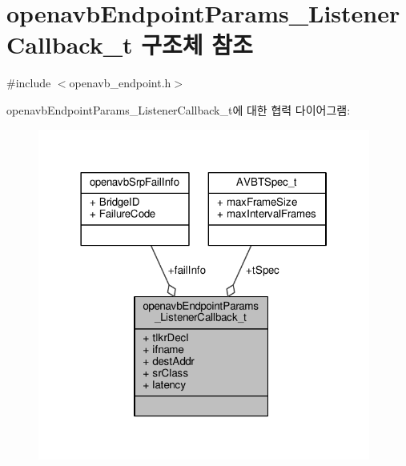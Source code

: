 \hypertarget{structopenavb_endpoint_params___listener_callback__t}{}\section{openavb\+Endpoint\+Params\+\_\+\+Listener\+Callback\+\_\+t 구조체 참조}
\label{structopenavb_endpoint_params___listener_callback__t}


{\ttfamily \#include $<$openavb\+\_\+endpoint.\+h$>$}



openavb\+Endpoint\+Params\+\_\+\+Listener\+Callback\+\_\+t에 대한 협력 다이어그램\+:
\nopagebreak
\begin{figure}[H]
\begin{center}
\leavevmode
\includegraphics[width=310pt]{structopenavb_endpoint_params___listener_callback__t__coll__graph}
\end{center}
\end{figure}
